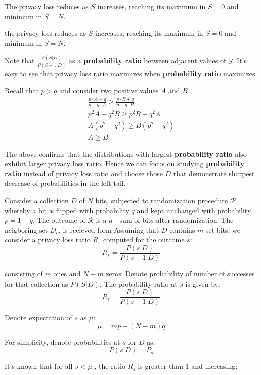 \documentclass[11pt]{article}
\newcommand{\cR}{\mathcal{R}}
\begin{document}
\begin{lem} \label{lem:rsreduce}
 The privacy loss reduces as $S$ increases, reaching its maximum in $S=0$ and minimum in $S=N$.
\end{lem}

 the privacy loss reduces as $S$ increases, reaching its maximum in $S=0$ and minimum in $S=N$.







Note that $\frac{P(S | D )}{P(S - 1| D )}$ as a \textbf{probability ratio} between adjacent values of $S$.  It's easy to see that privacy loss ratio maximizes when \textbf{probability ratio} maximizes. 

Recall that $p>q$ and consider two positive values $A$ and $B$ 
\begin{align*}
\frac{ p \cdot A + q } { p + q \cdot A }  \ge \frac{ p \cdot B + q } { p + q \cdot B } \\
p^2A + q^2B \ge p^2 B + q^2 A  \\
A (p^2 - q^2) \ge B (p^2 - q^2)  \\
A \ge B
\end{align*}

The above confirms that the distributions with largest \textbf{probability ratio} also exhibit larger privacy loss ratio. Hence we can focus on studying \textbf{probability ratio}  instead of privacy loss ratio and choose those $D$ that demonstrate sharpest decrease of probabilities in the left tail.




Consider a collection $D$ of $N$ bits, subjected to randomization procedure $\cR$, whereby a bit is flipped with probability $q$ and kept unchanged with probability $p=1-q$.  The outcome of $\cR$ is a $a$ - sum of bits after randomization. The neigboring set $D_m$ is recieved form Assuming that $D$ contains $m$ set bits, we consider a privacy loss ratio $R_s$ computed for the outcome $s$:
\[ R_s = \frac{P(s|D)}{P(s-1|D)} \] 


consisting of $m$ ones and $N-m$ zeros.  Denote probability of number of successes for that collection as $P(S|D)$.
The probability ratio at $s$  is given by:
\[ R_s = \frac{P(s|D)}{P(s-1|D)} \] 

Denote expectation of $s$ as $\mu$:
\[ \mu = mp + (N-m)q \]

For simplicity, denote probabilities at $s$ for $D$ as:
\[ P(s|D) = P_{s} \]

It's known that for all $s < \mu$ , the ratio $R_s$ is greater than $1$ and increasing:
\end{document}
